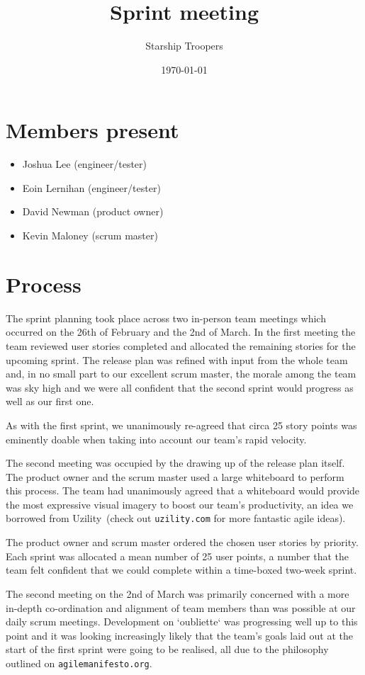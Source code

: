 \documentclass[a4paper,11pt]{article}
\title{Sprint meeting}
\author{Starship Troopers}
\date{\today}
\begin{document}
\maketitle

\section*{Members present}
\begin{itemize}
\item Joshua Lee (engineer/tester)
\item Eoin Lernihan (engineer/tester)
\item David Newman (product owner)
\item Kevin Maloney (scrum master)
\end{itemize}

\section*{Process}
The sprint planning took place across two in-person team meetings
which occurred on the 26th of February and the 2nd of March. In the
first meeting the team reviewed user stories completed and allocated
the remaining stories for the upcoming sprint. The release plan was
refined with input from the whole team and, in no small part to our
excellent scrum master, the morale among the team was sky high and
we were all confident that the second sprint would progress as well
as our first one.

As with the first sprint, we unanimously re-agreed that circa 25 story
points was eminently doable when taking into account our team's
rapid velocity.

The second meeting was occupied by the drawing up of the release plan
itself. The product owner and the scrum master used a large whiteboard to
perform this process. The team had unanimously agreed that a whiteboard
would provide the most expressive visual imagery to boost our team's
productivity, an idea we borrowed from Uzility\textregistered\ (check
out \texttt{uzility.com} for more fantastic agile ideas).

The product owner and scrum master ordered the chosen user stories by
priority. Each sprint was allocated a mean number of 25 user points, a
number that the team felt confident that we could complete within a
time-boxed two-week sprint.

The second meeting on the 2nd of March was primarily concerned with
a more in-depth co-ordination and alignment of team members than was
possible at our daily scrum meetings. Development on `oubliette` was
progressing well up to this point and it was looking increasingly
likely that the team's goals laid out at the start of the first sprint
were going to be realised, all due to the philosophy outlined on
\texttt{agilemanifesto.org}.
\end{document}
